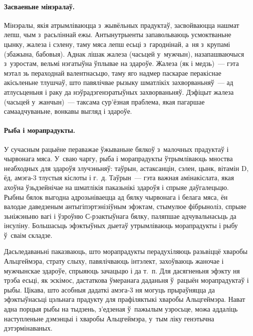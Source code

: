 \paragraph{Засваеньне мінэралаў.}
Мінэралы, якія атрымліваюцца з~жывёльных прадуктаў, засвойваюцца нашмат лепш, чым з~расьліннай ежы. Антынутрыенты запавольваюць усмоктваньне цынку, жалеза і сэлену, таму мяса лепш есьці з~гароднінай, а~ня з~крупамі (збажына, бабовыя). Аднак лішак жалеза (часьцей у~мужчын), назапашваючыся з~узростам, вельмі нэгатыўна ўплывае на здароўе. Жалеза (як і медзь)~--- гэта мэтал зь пераходнай валентнасьцю, таму яго надмер паскарае перакіснае акісьленьне тлушчаў, што павялічвае рызыку шматлікіх захворваньняў~--- ад атлусьценьня і раку да нэўрадэгенэратыўных захворваньняў. Дэфіцыт жалеза (часьцей у~жанчын)~--- таксама сур'ёзная праблема, якая пагаршае самаадчуваньне, вонкавы выгляд і здароўе.


\paragraph{Рыба і морапрадукты.}
У сучасным рацыёне пераважае ўжываньне бялкоў з~малочных прадуктаў і чырвонага мяса. У~сваю чаргу, рыба і морапрадукты ўтрымліваюць мноства неабходных для здароўя злучэньняў: таўрын, астаксанцін, сэлен, цынк, вітамін D, ёд, амэга-3 тлустыя кіслоты і г.~д. Таўрын~--- гэта важная амінакіслата, якая ахоўна ўзьдзейнічае на шматлікія паказьнікі здароўя і спрыяе даўгалецьцю. Рыбны бялок выгодна адрозьніваецца ад бялку чырвонага і белага мяса, ён валодае даведзеным антыгіпэртэнізіўным эфэктам, стымулюе фібрыноліз, спрыяе зьніжэньню вагі і ўзроўню С-рэактыўнага бялку, паляпшае адчувальнасьць да інсуліну. Большасьць эфэктыўных дыетаў утрымліваюць морапрадукты і рыбу ў~сваім складзе.

Дасьледаваньні паказваюць, што морапрадукты перадухіляюць разьвіццё хваробы Альцгеймэра, страту слыху, павялічваюць інтэлект, захоўваюць жаночае і мужчынскае здароўе, спрыяюць зачацьцю і да т.~п. Для дасягненьня эфэкту ня трэба есьці, як эскімос, дастаткова ўмеранага даданьня ў~рацыён морапрадуктаў і рыбы. Цікава, што асобныя дадаткі амэга-3 ня могуць прыраўняцца да эфэктыўнасьці цэльнага прадукту для прафіляктыкі хваробы Альцгеймэра. Нават адна порцыя рыбы на тыдзень, з'едзеная ў~пажылым узросьце, можа аддаліць наступленьне дэмэнцыі і хваробы Альцгеймэра, у~тым ліку генэтычна дэтэрмінаваных.

